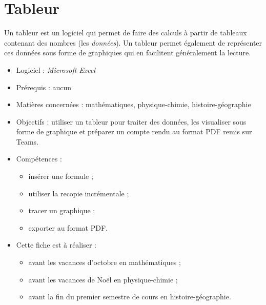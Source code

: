 \chapter{Tableur}\label{ficheTableur1}  

Un tableur est un logiciel qui permet de faire des calculs à partir de tableaux contenant des nombres (les \emph{données}). Un tableur permet également de représenter ces données sous forme de graphiques qui en facilitent généralement la lecture.\\


{\footnotesize
\begin{itemize}
\item Logiciel : \emph{Microsoft Excel}
\item Prérequis : aucun
\item Matières concernées : mathématiques, physique-chimie, histoire-géographie
\item Objectifs : utiliser un tableur pour traiter des données, les visualiser sous forme de graphique et préparer un compte rendu au format PDF remis sur Teams.
\item Compétences : 
        \begin{itemize}
        \item insérer une formule ;
        \item utiliser la recopie incrémentale ;
        \item tracer un graphique ;
        \item exporter au format PDF.
        \end{itemize}
\item Cette fiche est à réaliser :
        \begin{itemize}
        \item avant les vacances d'octobre en mathématiques ;
        \item avant les vacances de Noël en physique-chimie ;
        \item avant la fin du premier semestre de cours en histoire-géographie. 
        \end{itemize}
\end{itemize}
}



